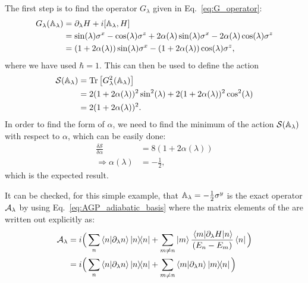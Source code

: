 The first step is to find the operator $G_{\lambda}$ given in Eq.~\eqref{eq:G_operator}:
\begin{equation}
    \begin{aligned}
        G_{\lambda}(\approxAGP) &= \dlambda H + i\comm{\approxAGP}{H} \\
        & = \sin(\lambda)\sx - \cos(\lambda)\sz + 2\alpha(\lambda)\sin(\lambda)\sx - 2\alpha(\lambda) \cos(\lambda)\sz \\
        & = (1 + 2\alpha(\lambda))\sin(\lambda) \sx - (1 + 2\alpha(\lambda))\cos(\lambda)\sz,
    \end{aligned}
\end{equation}
where we have used $\hbar = 1$. This can then be used to define the action
\begin{equation}
    \begin{aligned}
        \mathcal{S}(\mathbb{A}_{\lambda}) &= \Tr\left[G^2_{\lambda}(\mathbb{A}_{\lambda}) \right] \\
        & = 2 (1 + 2\alpha(\lambda))^2 \sin^2(\lambda) + 2 (1 + 2\alpha(\lambda))^2 \cos^2(\lambda) \\
        & = 2 (1 + 2\alpha(\lambda))^2.
    \end{aligned}
\end{equation}
In order to find the form of $\alpha$, we need to find the minimum of the action $\mathcal{S}(\mathbb{A}_{\lambda})$ with respect to $\alpha$, which can be easily done:
\begin{equation}
    \begin{aligned}
        \frac{\delta \mathcal{S}}{\delta \alpha} &= 8(1 + 2\alpha(\lambda)) \\
        \Rightarrow \alpha(\lambda) &= -\frac{1}{2},
    \end{aligned}
\end{equation}
which is the expected result. 

It can be checked, for this simple example, that $\mathbb{A}_{\lambda} = -\frac{1}{2} \sigma^y$ is the exact  operator $\mathcal{A}_{\lambda}$ by using Eq.~\eqref{eq:AGP_adiabatic_basis} where the matrix elements of the  are written out explicitly as:
\begin{equation}
    \begin{aligned}
        \AGP{\lambda} &= i \Big(\sum_n \braket{n}{\dlambda n} \dyad{n} + \sum_{m \neq n} \ket{m} \frac{\mel{m}{\dlambda H}{n}}{(E_n - E_m)} \bra{n} \Big) \\
        & = i \Big(\sum_n \braket{n}{\dlambda n} \dyad{n} + \sum_{m \neq n} \braket{m}{\dlambda n} \dyad{m}{n}\Big)
    \end{aligned}
\end{equation}


